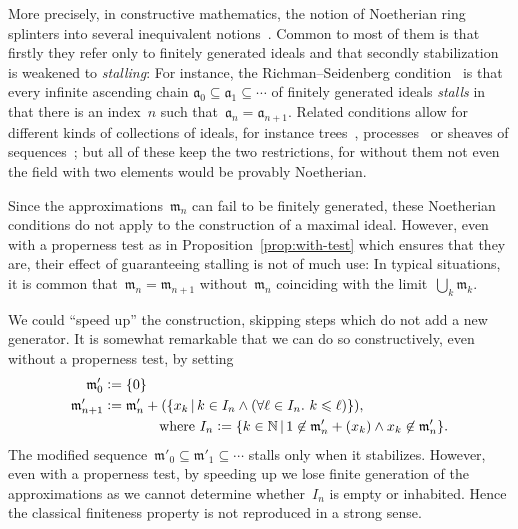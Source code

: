 \documentclass[com,11pt,crcready]{iosart2x}
\theoremstyle{definition}
\theoremstyle{plain}
\theoremstyle{remark}
\newcommand{\aaa}{\mathfrak{a}}
\newcommand{\mmm}{\mathfrak{m}}
\newcommand{\NN}{\mathbb{N}}
\newcommand{\defeq}{\vcentcolon=}
\renewcommand{\_}{\mathpunct{.}\,}
\begin{document}
More precisely, in constructive mathematics, the notion of Noetherian ring
splinters into several inequivalent notions~\cite{richman:noetherian,mines-richman-ruitenburg:constructive-algebra,perdry:noetherian,perdry:lazy,perdry-schuster:noetherian,schuster-zappe:noetherian,coquand-lombardi:krull,coquand:invariant,tennenbaum:hilbert,seidenberg:noether,jacobsson-lofwall:standard}. Common to most of them
is that firstly they refer only to finitely generated ideals and that secondly
stabilization is weakened to \emph{stalling}: For instance, the Richman--Seidenberg
condition~\cite[Section~III.2]{mines-richman-ruitenburg:constructive-algebra}
is that every infinite ascending chain
$\aaa_0 \subseteq \aaa_1 \subseteq \cdots$ of finitely generated ideals
\emph{stalls} in that there is an index~$n$ such that~$\aaa_n = \aaa_{n+1}$.
Related conditions allow for different kinds of collections of ideals, for
instance trees~\cite{richman:noetherian}, processes~\cite[Section~3.9]{blechschmidt:phd} or
sheaves of sequences~\cite{coquand-lombardi:krull,coquand:invariant,blechschmidt:multiverse};
but all of these keep the two restrictions, for without them not
even the field with two elements would be provably Noetherian.

Since the approximations~$\mmm_n$ can fail to be finitely generated, these
Noetherian conditions do not apply to the construction of a maximal ideal.
However, even with a properness test as in Proposition~\ref{prop:with-test}
which ensures that they are, their effect of guaranteeing stalling is not of
much use: In typical situations, it is common that~$\mmm_n = \mmm_{n+1}$
without~$\mmm_n$ coinciding with the limit~$\bigcup_k \mmm_k$.

We could ``speed up'' the construction, skipping steps which do not add a new
generator. It is somewhat remarkable that we can do so constructively, even
without a properness test, by setting
\begin{align*}
  \mmm'_0 &\defeq \{ 0 \} \\
  \mmm'_{n+1} &\defeq \mmm'_n + (\{ x_k \,|\,
    k \in I_n \wedge (\forall \ell \in I_n\_ k \leq \ell) \}), \\
  &\qquad\qquad\text{where $I_n \defeq \{ k \in \NN \,|\, 1 \not\in \mmm'_n +
  (x_k) \wedge x_k \not\in \mmm'_n \}$.}
\end{align*}
The modified sequence~$\mmm'_0 \subseteq \mmm'_1 \subseteq \cdots$ stalls only
when it stabilizes. However, even with a properness test, by speeding up we lose
finite generation of the approximations as we cannot determine whether~$I_n$ is
empty or inhabited. Hence the classical
finiteness property is not reproduced in a strong sense.
\end{document}
